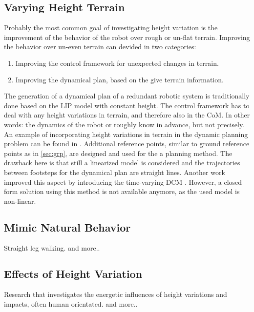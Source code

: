 \subsection{Varying Height Terrain}
Probably the most common goal of investigating height variation is the improvement of the behavior of the robot over rough or un-flat terrain. Improving the behavior over un-even terrain can devided in two categories:
\begin{enumerate}
	\item Improving the control framework for unexpected changes in terrain.
	\item Improving the dynamical plan, based on the give terrain information.
\end{enumerate} 
The generation of a dynamical plan of a redundant robotic system is traditionally done based on the \ac{LIP} model with constant height. The control framework has to deal with any height variations in terrain, and therefore also in the \ac{CoM}. In other words: the dynamics of the robot or roughly know in advance, but not precisely.\\
An example of incorporating height variations in terrain in the dynamic planning problem can be found in \cite{englsberger2013three}. Additional reference points, similar to ground reference points as in \ref{sec:grp}, are designed and used for the a planning method. The drawback here is that still a linearized model is considered and the trajectories between footsteps for the dynamical plan are straight lines. Another work improved this aspect by introducing the time-varying \ac{DCM} \cite{hopkins2014humanoid}. However, a closed form solution using this method is not available anymore, as the used model is non-linear.
\subsection{Mimic Natural Behavior}
Straight leg walking.
\cite{griffin2018straight} and more..
\subsection{Effects of Height Variation}
Research that investigates the energetic influences of height variations and impacts, often human orientated.
\cite{kuo2005energetic} \cite{lee1998determinants} \cite{gao2017increase} and more..
